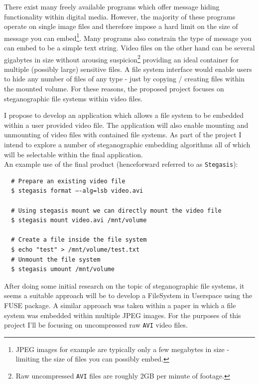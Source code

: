 \documentclass[paper=a4, fontsize=11pt,twoside]{scrartcl}
\numberwithin{table}{section}
\numberwithin{figure}{section}
\numberwithin{algorithm}{section}
\begin{document}
There exist many freely available programs which offer message hiding functionality within digital media. However, the majority of these programs operate on single image files and therefore impose a hard limit on the size of message you can embed\footnote{JPEG images for example are typically only a few megabytes in size - limiting the size of files you can possibly embed.}. Many programs also constrain the type of message you can embed to be a simple text string. Video files on the other hand can be several gigabytes in size without arousing suspicion\footnote{Raw uncompressed \texttt{AVI} files are roughly 2GB per minute of footage.} providing an ideal container for multiple (possibly large) sensitive files. A file system interface would enable users to hide any number of files of any type - just by copying / creating files within the mounted volume. For these reasons, the proposed project focuses on steganographic file systems within video files.

I propose to develop an application which allows a file system to be embedded within a user provided video file. The application will also enable mounting and unmounting of video files with contained file systems. As part of the project I intend to explore a number of steganographic embedding algorithms all of which will be selectable within the final application.\\

\noindent
An example use of the final product (henceforward referred to as \texttt{Stegasis}):
\begin{verbatim}
  # Prepare an existing video file
  $ stegasis format –-alg=lsb video.avi
     
  # Using stegasis mount we can directly mount the video file
  $ stegasis mount video.avi /mnt/volume
 
  # Create a file inside the file system
  $ echo "test" > /mnt/volume/test.txt
  # Unmount the file system
  $ stegasis umount /mnt/volume
\end{verbatim}
 
After doing some initial research on the topic of steganographic file systems, it seems a suitable approach will be to develop a FileSystem in Userspace using the FUSE package. A similar approach was taken within a paper in which a file system was embedded within multiple JPEG images. For the purposes of this project I'll be focusing on uncompressed raw \texttt{AVI} video files.
 
\end{document}
